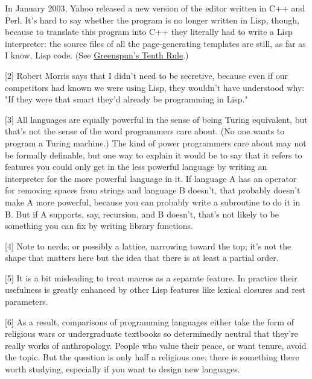In January 2003, Yahoo
                  released a new version of the editor written in C++ and Perl.
                  It's hard to say whether the program is no longer written in
                  Lisp, though, because to translate this program into C++ they
                  literally had to write a Lisp interpreter: the source files of
                  all the page-generating templates are still, as far as I know,
                  Lisp code. (See
                  \href{http://www.paulgraham.com/quotes.html}{Greenspun's Tenth Rule}.)

[2] Robert Morris says that I didn't need to be
                  secretive, because even if our competitors had known we were
                  using Lisp, they wouldn't have understood why: "If they were
                  that smart they'd already be programming in Lisp."

[3]
                  All languages are equally powerful in the sense of being
                  Turing equivalent, but that's not the sense of the word
                  programmers care about. (No one wants to program a Turing
                  machine.) The kind of power programmers care about may not be
                  formally definable, but one way to explain it would be to say
                  that it refers to features you could only get in the less
                  powerful language by writing an interpreter for the more
                  powerful language in it. If language A has an operator for
                  removing spaces from strings and language B doesn't, that
                  probably doesn't make A more powerful, because you can
                  probably write a subroutine to do it in B. But if A supports,
                  say, recursion, and B doesn't, that's not likely to be
                  something you can fix by writing library functions.

[4]
                  Note to nerds: or possibly a lattice, narrowing toward the
                  top; it's not the shape that matters here but the idea that
                  there is at least a partial order.

[5] It is a bit
                  misleading to treat macros as a separate feature. In practice
                  their usefulness is greatly enhanced by other Lisp features
                  like lexical closures and rest parameters.

[6] As a
                  result, comparisons of programming languages either take the
                  form of religious wars or undergraduate textbooks so
                  determinedly neutral that they're really works of
                  anthropology. People who value their peace, or want tenure,
                  avoid the topic. But the question is only half a religious
                  one; there is something there worth studying, especially if
                  you want to design new languages.


              
            
          
